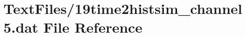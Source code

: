 \hypertarget{19time2histsim__channel5_8dat}{}\section{Text\+Files/19time2histsim\+\_\+channel5.dat File Reference}
\label{19time2histsim__channel5_8dat}
